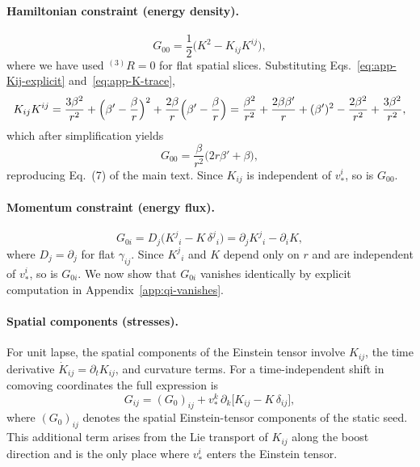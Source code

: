 \documentclass[11pt]{article}
\begin{document}
\paragraph{Hamiltonian constraint (energy density).}
\begin{equation}
\label{eq:app-G00}
G_{00} = \frac{1}{2}\bigl(K^2 - K_{ij}K^{ij}\bigr),
\end{equation}
where we have used ${}^{(3)}\!R = 0$ for flat spatial slices. Substituting Eqs.~\eqref{eq:app-Kij-explicit} and~\eqref{eq:app-K-trace},
\begin{equation}
K_{ij}K^{ij} = \frac{3\beta^2}{r^2} + \Bigl(\beta' - \frac{\beta}{r}\Bigr)^2 + \frac{2\beta}{r}\Bigl(\beta' - \frac{\beta}{r}\Bigr) = \frac{\beta^2}{r^2} + \frac{2\beta\beta'}{r} + (\beta')^2 - \frac{2\beta^2}{r^2} + \frac{3\beta^2}{r^2},
\end{equation}
which after simplification yields
\begin{equation}
G_{00} = \frac{\beta}{r^2}\bigl(2r\beta' + \beta\bigr),
\end{equation}
reproducing Eq.~(7) of the main text. Since $K_{ij}$ is independent of $v_*^i$, so is $G_{00}$.

\paragraph{Momentum constraint (energy flux).}
\begin{equation}
\label{eq:app-G0i}
G_{0i} = D_j\bigl(K^j{}_i - K\,\delta^j{}_i\bigr) = \partial_j K^j{}_i - \partial_i K,
\end{equation}
where $D_j = \partial_j$ for flat $\gamma_{ij}$. Since $K^j{}_i$ and $K$ depend only on $r$ and are independent of $v_*^i$, so is $G_{0i}$. We now show that $G_{0i}$ vanishes identically by explicit computation in Appendix~\ref{app:qi-vanishes}.

\paragraph{Spatial components (stresses).}
For unit lapse, the spatial components of the Einstein tensor involve $K_{ij}$, the time derivative $\dot K_{ij} = \partial_t K_{ij}$, and curvature terms. For a time-independent shift in comoving coordinates the full expression is
\begin{equation}
G_{ij} = (G_0)_{ij} + v_*^k\,\partial_k\bigl[K_{ij} - K\,\delta_{ij}\bigr],
\end{equation}
where $(G_0)_{ij}$ denotes the spatial Einstein-tensor components of the static seed. This additional term arises from the Lie transport of $K_{ij}$ along the boost direction and is the only place where $v_*^i$ enters the Einstein tensor.
\end{document}
